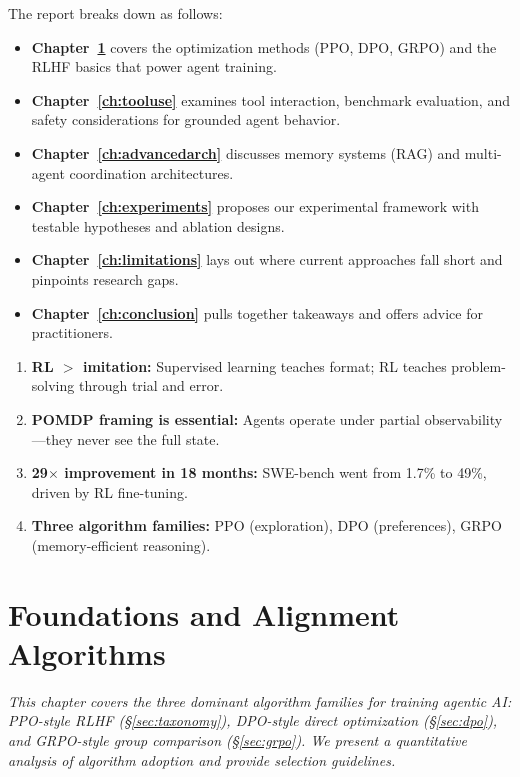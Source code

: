 \documentclass[12pt,a4paper]{report}
\theoremstyle{definition}
\begin{document}
The report breaks down as follows:
\begin{itemize}
    \item \textbf{Chapter~\ref{ch:foundations}} covers the optimization methods (PPO, DPO, GRPO) and the RLHF basics that power agent training.
    \item \textbf{Chapter~\ref{ch:tooluse}} examines tool interaction, benchmark evaluation, and safety considerations for grounded agent behavior.
    \item \textbf{Chapter~\ref{ch:advancedarch}} discusses memory systems (RAG) and multi-agent coordination architectures.
    \item \textbf{Chapter~\ref{ch:experiments}} proposes our experimental framework with testable hypotheses and ablation designs.
    \item \textbf{Chapter~\ref{ch:limitations}} lays out where current approaches fall short and pinpoints research gaps.
    \item \textbf{Chapter~\ref{ch:conclusion}} pulls together takeaways and offers advice for practitioners.
\end{itemize}

\begin{tcolorbox}[colback=cyan!5!white, colframe=cyan!60!black, title=\textbf{Chapter 1 Key Takeaways}]
\begin{enumerate}
    \item \textbf{RL $>$ imitation:} Supervised learning teaches format; RL teaches problem-solving through trial and error.
    \item \textbf{POMDP framing is essential:} Agents operate under partial observability---they never see the full state.
    \item \textbf{29$\times$ improvement in 18 months:} SWE-bench went from 1.7\% to 49\%, driven by RL fine-tuning.
    \item \textbf{Three algorithm families:} PPO (exploration), DPO (preferences), GRPO (memory-efficient reasoning).
\end{enumerate}
\end{tcolorbox}

\chapter{Foundations and Alignment Algorithms}
\label{ch:foundations}

\textit{This chapter covers the three dominant algorithm families for training agentic AI: PPO-style RLHF (\S\ref{sec:taxonomy}), DPO-style direct optimization (\S\ref{sec:dpo}), and GRPO-style group comparison (\S\ref{sec:grpo}). We present a quantitative analysis of algorithm adoption and provide selection guidelines.}
\end{document}
